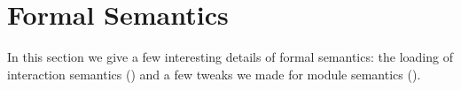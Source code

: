 \chapter{\;\;\;\;Formal Semantics}
\label{sec:main-semantics}









In this section we give a few interesting details of formal semantics: the loading of interaction
semantics () and a few tweaks we made for module semantics
().


